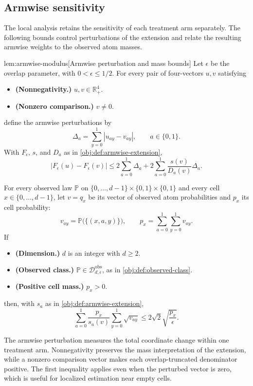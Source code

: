 \subsection{Armwise sensitivity}

The local analysis retains the sensitivity of each treatment arm separately. The following bounds control perturbations of the extension and relate the resulting armwise weights to the observed atom masses.

\begin{lemmav}{lem:armwise-modulus}[Armwise perturbation and mass bounds]
Let \(\epsilon\) be the overlap parameter, with \(0<\epsilon\leq 1/2\). For every pair of four-vectors \(u,v\) satisfying
\begin{itemize}
\item \textbf{(Nonnegativity.)} \(u,v\in\mathbb R_+^4\).
\item \textbf{(Nonzero comparison.)} \(v\neq 0\).
\end{itemize}
define the armwise perturbations by
\[
\Delta_a=\sum_{y=0}^1|u_{ay}-v_{ay}|,\qquad a\in\{0,1\}.
\]
With \(F_\epsilon\), \(s\), and \(D_a\) as in \cref{obj:def:armwise-extension},
\[
|F_\epsilon(u)-F_\epsilon(v)|
\leq
2\sum_{a=0}^1\Delta_a
+
2\sum_{a=0}^1\frac{s(v)}{D_a(v)}\Delta_a.
\]

For every observed law \(\mathbb P\) on
\(\{0,\ldots,d-1\}\times\{0,1\}\times\{0,1\}\) and every cell \(x\in\{0,\ldots,d-1\}\), let \(v=q_x\) be its vector of observed atom probabilities and \(p_x\) its cell probability:
\[
v_{ay}=\mathbb P\bigl(\{(x,a,y)\}\bigr),
\qquad
p_x=\sum_{a=0}^1\sum_{y=0}^1v_{ay}.
\]
If
\begin{itemize}
\item \textbf{(Dimension.)} \(d\) is an integer with \(d\geq2\).
\item \textbf{(Observed class.)} \(\mathbb P\in\mathcal D_{d,\epsilon}^{\mathrm{obs}}\), as in \cref{obj:def:observed-class}.
\item \textbf{(Positive cell mass.)} \(p_x>0\).
\end{itemize}
then, with \(s_a\) as in \cref{obj:def:armwise-extension},
\[
\sum_{a=0}^1\frac{p_x}{s_a(v)}
\sum_{y=0}^1\sqrt{v_{ay}}
\leq
2\sqrt{2}\sqrt{\frac{p_x}{\epsilon}}.
\]
\end{lemmav}

The armwise perturbation  measures the total coordinate change within one treatment arm. Nonnegativity preserves the mass interpretation of the extension, while a nonzero comparison vector makes each overlap-truncated denominator positive. The first inequality applies even when the perturbed vector is zero, which is useful for localized estimation near empty cells.

